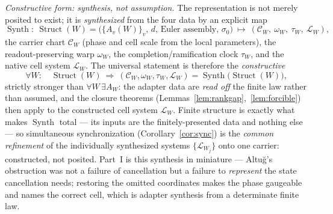 \documentclass[11pt]{article}
\theoremstyle{definition}
\begin{document}
\emph{Constructive form: synthesis, not assumption.} The representation is not merely posited to exist; it is
\emph{synthesized} from the four data by an explicit map
\[
  \operatorname{Synth}:\ \operatorname{Struct}(W)=\big(\{A_v(W)\}_v,\,d,\,\text{Euler assembly},\,\sigma_0\big)
  \ \longmapsto\ (\mathcal C_W,\ \omega_W,\ \tau_W,\ \mathcal L_W),
\]
the carrier chart $\mathcal C_W$ (phase and cell scale from the local parameters), the readout-preserving warp
$\omega_W$, the completion/ramification clock $\tau_W$, and the native cell system $\mathcal L_W$. The universal
statement is therefore the \emph{constructive}
\[
  \forall W:\quad \operatorname{Struct}(W)\ \Longrightarrow\ (\mathcal C_W,\omega_W,\tau_W,\mathcal L_W)
  =\operatorname{Synth}\big(\operatorname{Struct}(W)\big),
\]
strictly stronger than $\forall W\,\exists A_W$: the adapter data are \emph{read off} the finite law rather than
assumed, and the closure theorems (Lemmas~\ref{lem:rankgap},~\ref{lem:forcible}) then apply to the constructed
cell system $\mathcal L_W$. Finite structure is exactly what makes $\operatorname{Synth}$ total --- its inputs are
the finitely-presented data and nothing else --- so simultaneous synchronization (Corollary~\ref{cor:sync}) is the
\emph{common refinement} of the individually synthesized systems $\{\mathcal L_{W_j}\}$ onto one carrier:
constructed, not posited. Part~I is this synthesis in miniature --- Altu\u{g}'s obstruction was not a failure of
cancellation but a failure to \emph{represent} the state cancellation needs; restoring the omitted coordinates
makes the phase gaugeable and names the correct cell, which is adapter synthesis from a determinate finite law.
\end{document}

